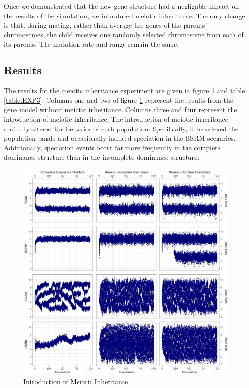 \documentclass{article}
\begin{document}
Once we demonstrated that the new gene structure had a negligable impact on the results of the simulation, we introduced meiotic inheritance. The only change is that, during mating, rather than average the genes of the parents' chromosomes, the child receives one randomly selected chromosome from each of its parents. The mutation rate and range remain the same.

\subsection{Results}

The results for the meiotic inheritance experiment are given in figure \ref{fig:EXP3} and table \ref{table:EXP3}. Columns one and two of figure \ref{fig:EXP3} represent the results from the gene model without meiotic inheritance. Columns three and four represent the introduction of meiotic inheritance. The introduction of meiotic inheritance radically altered the behavior of each population. Specifically, it broadened the population bands and occasionally induced speciation in the BSRM scenarios. Additionally, speciation events occur far more frequently in the complete dominance structure than in the incomplete dominance structure.

\begin{figure}
    \centering
    \includegraphics[width=\linewidth]{Data/EXP3}
    \caption{Introduction of Meiotic Inheritance}
    \label{fig:EXP3}
\end{figure}
\end{document}
